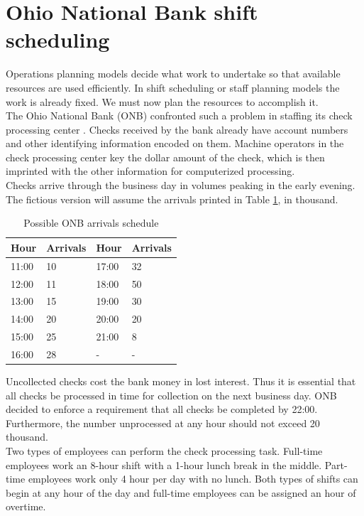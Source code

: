 \documentclass[a4paper,10 pt,titlepage,twoside]{book}
\theoremstyle{plain}
\theoremstyle{definition}
\theoremstyle{remark}
\begin{document}
\section{Ohio National Bank shift scheduling}
Operations planning models decide what work to undertake so that available resources are used efficiently. In shift scheduling or staff planning models the work is already fixed. We must now plan the resources to accomplish it.\\
The Ohio National Bank (ONB) confronted such a problem in staffing its check processing center \cite{ONB}. Checks received by the bank already have account numbers and other identifying information encoded on them. Machine operators in the check processing center key the dollar  amount of the check, which is then imprinted with the other information for computerized processing.\\Checks arrive through the business day in volumes peaking in the early evening. The fictious version will assume the arrivals printed in Table \ref{table:shiftscheduling}, in thousand. \\
\begin{table}[h]\caption{\label{table:shiftscheduling}Possible ONB arrivals schedule}
	\begin{center}
	\begin{tabular}{ll|ll}
		\hline
		\textbf{Hour} & \textbf{Arrivals} & \textbf{Hour} & \textbf{Arrivals} \\ \hline
		11:00 & 10 & 17:00 & 32 \\
		12:00 & 11 & 18:00 & 50 \\
		13:00 & 15 & 19:00 & 30 \\
		14:00 & 20 & 20:00 & 20 \\
		15:00 & 25 & 21:00 & 8 \\
		16:00 & 28 & - & -   \\ \hline
	\end{tabular}
\end{center}
\end{table}
Uncollected checks cost the bank money in lost interest. Thus it is essential that all checks be processed in time for collection on the next business day. ONB decided to enforce a requirement that all checks be completed by 22:00. Furthermore, the number unprocessed at any hour should not exceed 20 thousand. \\
Two types of employees can perform the check processing task. Full-time employees work an 8-hour shift with a 1-hour lunch break in the middle. Part-time employees work only 4 hour per day with no lunch. Both types of shifts can begin at any hour of the day and full-time employees can be assigned an hour of overtime.\\
\end{document}
